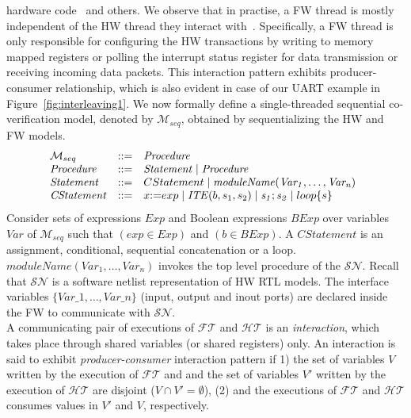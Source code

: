 \documentclass[sigconf]{acmart}
\begin{document}
hardware code~\cite{codes14} and others.  We observe that in practise, a FW 
thread is mostly independent of the HW thread they interact with~\cite{hvc,codes14}.  
Specifically, a FW thread is only responsible for configuring the 
HW transactions by writing to memory mapped registers or polling 
the interrupt status register for data transmission or receiving 
incoming data packets. This interaction pattern exhibits producer-consumer 
relationship, which is also evident in case of our UART example in 
Figure~\ref{fig:interleaving1}.  
%
We now formally define a single-threaded sequential co-verification model, 
denoted by $\mathcal{M}_{seq}$, obtained by sequentializing the HW and FW 
models.
%
\[ 
\begin{array}[t]{@{}lll}
  \mathcal{M}_{seq} & {:}{:}{=} & \mathit{Procedure} \\
\mathit{Procedure} & {:}{:}{=} & \mathit{Statement} \mid \mathit{Procedure} \\
\mathit{Statement} & {:}{:}{=} & CStatement \mid \mathit{moduleName(Var_1,\dots,Var_n)} \\
\mathit{CStatement} & {:}{:}{=} & x {:}{=} exp \mid \mathit{ITE}(b, s_1,s_2) \mid \mathit{s_1;s_2} \mid loop\{s\} \\ 
\end{array}
\]
%
Consider sets of expressions $Exp$ and Boolean expressions $BExp$ 
over variables $Var$ of $\mathcal{M}_{seq}$ such that $(exp \in Exp)$ and 
$(b \in BExp)$. A $\mathit{CStatement}$ is an assignment,
conditional, sequential concatenation or a loop.
$\mathit{moduleName(Var_1,\dots,Var_n)}$ invokes the top level 
procedure of the $\mathcal{SN}$. Recall that $\mathcal{SN}$ is a
software netlist representation of HW RTL models.
The interface variables $\{Var\_1,\dots,Var\_n\}$ 
(input, output and inout ports) are declared inside the 
FW to communicate with $\mathcal{SN}$. \\ 
%
%
A communicating pair of executions of 
$\mathcal{FT}$ and $\mathcal{HT}$ is an {\em interaction}, which 
takes place through shared variables (or shared registers)
only.  An interaction is said to exhibit {\em producer-consumer}
interaction pattern if 1) the set of variables $V$ written by 
the execution of $\mathcal{FT}$ and and the set of variables 
$V'$ written by the execution of $\mathcal{HT}$ are disjoint 
($V \cap V' = \emptyset$), (2) and the executions 
of $\mathcal{FT}$ and $\mathcal{HT}$ consumes values 
in $V'$ and $V$, respectively.
\end{document}
